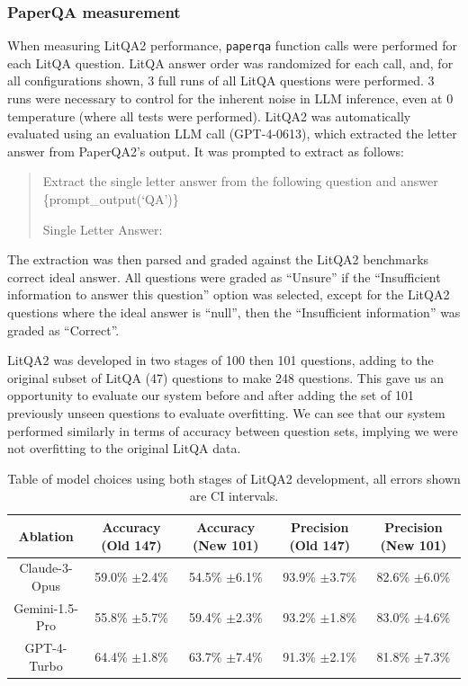 \documentclass{article}
\begin{document}
\subsubsection{PaperQA measurement}
When measuring LitQA2 performance, \texttt{paperqa} function calls were performed for each LitQA question. LitQA answer order was randomized for each call, and, for all configurations shown, 3 full runs of all LitQA questions were performed. 3 runs were necessary to control for the inherent noise in LLM inference, even at 0 temperature (where all tests were performed).  LitQA2 was automatically evaluated using an evaluation LLM call (GPT-4-0613), which extracted the letter answer from PaperQA2's output. It was prompted to extract as follows: 

\begin{quote}
Extract the single letter answer from the following question and answer
\{prompt\_output(`QA')\}

Single Letter Answer:
\end{quote}

The extraction was then parsed and graded against the LitQA2 benchmarks correct ideal answer. All questions were graded as ``Unsure'' if the ``Insufficient information to answer this question'' option was selected, except for the LitQA2 questions where the ideal answer is ``null'', then the ``Insufficient information'' was graded as ``Correct''. 

LitQA2 was developed in two stages of 100 then 101 questions, adding to the original subset of LitQA (47) questions to make 248 questions. This gave us an opportunity to evaluate our system before and after adding the set of 101 previously unseen questions to evaluate overfitting. We can see that our system performed similarly in terms of accuracy between question sets, implying we were not overfitting to the original LitQA data. 

\begin{table}[h]
\centering
\begin{tabular}{|c|c|c|c|c|}
\hline
Ablation & Accuracy (Old 147) & Accuracy (New 101) & Precision (Old 147) & Precision (New 101) \\ \hline
Claude-3-Opus & 59.0\% $\pm $2.4\% & 54.5\% $\pm $6.1\% & 93.9\% $\pm $3.7\% & 82.6\% $\pm $6.0\% \\ \hline
Gemini-1.5-Pro & 55.8\% $\pm $5.7\% & 59.4\% $\pm $2.3\% & 93.2\% $\pm $1.8\% & 83.0\% $\pm $4.6\% \\ \hline
GPT-4-Turbo &  64.4\% $\pm $1.8\% & 63.7\% $\pm $7.4\% & 91.3\% $\pm $2.1\% & 81.8\% $\pm $7.3\% \\ \hline
\end{tabular}
\caption{Table of model choices using both stages of LitQA2 development, all errors shown are CI intervals.}
\label{tab:litqa_before_after}
\end{table}
\end{document}
